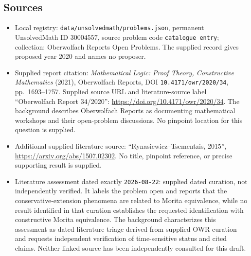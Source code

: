\documentclass[11pt]{article}
\begin{document}
\subsection{Sources}
\begin{itemize}
\item Local registry: \texttt{data/unsolvedmath/problems.json}, permanent UnsolvedMath ID \(30004557\), source problem code \texttt{catalogue entry}; collection: Oberwolfach Reports Open Problems. The supplied record gives proposed year \(2020\) and names no proposer.
\item Supplied report citation: \emph{Mathematical Logic: Proof Theory, Constructive Mathematics} (2021), Oberwolfach Reports, DOI \texttt{10.4171/owr/2020/34}, pp.~1693--1757. Supplied source URL and literature-source label ``Oberwolfach Report 34/2020'': \url{https://doi.org/10.4171/owr/2020/34}. The background describes Oberwolfach Reports as documenting mathematical workshops and their open-problem discussions. No pinpoint location for this question is supplied.
\item Additional supplied literature source: ``Rynasiewicz--Tsementzis, 2015'', \url{https://arxiv.org/abs/1507.02302}. No title, pinpoint reference, or precise supporting result is supplied.
\item Literature assessment dated exactly \texttt{2026-08-22}: supplied dated curation, not independently verified. It labels the problem open and reports that the conservative-extension phenomena are related to Morita equivalence, while no result identified in that curation establishes the requested identification with constructive Morita equivalence. The background characterizes this assessment as dated literature triage derived from supplied OWR curation and requests independent verification of time-sensitive status and cited claims. Neither linked source has been independently consulted for this draft.
\end{itemize}
\end{document}

